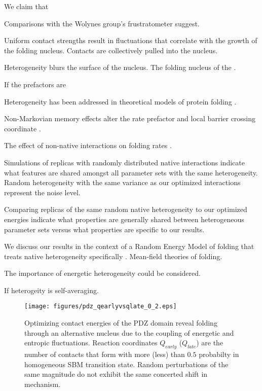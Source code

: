 \documentclass[preprint]{elsarticle}
\begin{document}
We claim that 

Comparisons with the Wolynes group's frustratometer suggest.

Uniform contact strengths result in fluctuations that correlate with
the growth of the folding nucleus. Contacts are collectively pulled into the
nucleus.

Heterogeneity blurs the surface of the nucleus. The folding nucleus of the .

If the prefactors are 


Heterogeneity has been addressed in theoretical models of protein folding \cite{Plotkin2002a}.

Non-Markovian memory effects alter the rate prefactor and local barrier
crossing coordinate \cite{Portman2001,Portman2001a,Plotkin1998}.

The effect of non-native interactions on folding rates \cite{Plotkin2001,Clementi2004}.

    Simulations of replicas with randomly distributed native interactions
indicate what features are shared amongst all parameter sets with the same
heterogeneity. Random heterogeneity with the same variance as our optimized
interactions represent the noise level.

    Comparing replicas of the same random native heterogeneity to our optimized
energies indicate what properties are generally shared between heterogeneous
parameter sets versus what properties are specific to our results.

    We discuss our results in the context of a Random Energy Model of folding 
that treats native heterogeneity specifically \cite{Plotkin2002a}. 
Mean-field theories of folding. 

The importance of energetic heterogeneity could be considered. 

If heterogeity is self-averaging.



\begin{figure}
\texttt{[image: figures/pdz\_qearlyvsqlate\_0\_2.eps]}
\caption{Optimizing contact energies of the PDZ domain reveal folding through
an alternative nucleus due to the coupling of energetic and entropic
fluctuations. Reaction coordinates $Q_{early}$ ($Q_{late}$) are the number of
contacts that form with more (less) than $0.5$ probabilty in homogeneous SBM
transition state. Random perturbations of the same magnitude do not exhibit the
same concerted shift in mechanism.}
\end{figure}
\end{document}
